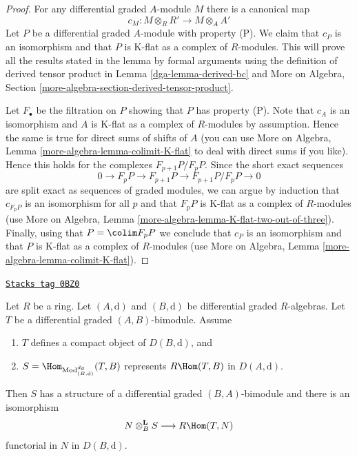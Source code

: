 \begin{proof}

For any differential graded $A$-module $M$ there is a canonical map
$$
c_M : M \otimes_R R' \longrightarrow M \otimes_A A'
$$
Let $P$ be a differential graded $A$-module with property (P).
We claim that $c_P$ is an isomorphism and that $P$ is K-flat
as a complex of $R$-modules. This will prove all the results
stated in the lemma by formal arguments using the definition
of derived tensor product in Lemma \ref{dga-lemma-derived-bc} and
More on Algebra, Section \ref{more-algebra-section-derived-tensor-product}.

\medskip\noindent
Let $F_\bullet$ be the filtration on $P$ showing that $P$ has property (P).
Note that $c_A$ is an isomorphism and $A$ is K-flat as a complex
of $R$-modules by assumption. Hence the same is true for
direct sums of shifts of $A$ (you can use
More on Algebra, Lemma \ref{more-algebra-lemma-colimit-K-flat}
to deal with direct sums if you like).
Hence this holds for the complexes $F_{p + 1}P/F_pP$.
Since the short exact sequences
$$
0 \to F_pP \to F_{p + 1}P \to F_{p + 1}P/F_pP \to 0
$$
are split exact as sequences of graded modules, we can argue
by induction that $c_{F_pP}$ is an isomorphism for all $p$
and that $F_pP$ is K-flat as a complex of $R$-modules (use
More on Algebra, Lemma \ref{more-algebra-lemma-K-flat-two-out-of-three}).
Finally, using that $P = \colim F_pP$ we conclude that
$c_P$ is an isomorphism and that $P$ is K-flat
as a complex of $R$-modules (use
More on Algebra, Lemma \ref{more-algebra-lemma-colimit-K-flat}).
\end{proof}

\begin{lemma}
\label{dga-lemma-RHom-is-tensor}
\href{https://stacks.math.columbia.edu/tag/0BZ0}{\texttt{Stacks tag 0BZ0}}

Let $R$ be a ring.
Let $(A, \text{d})$ and $(B, \text{d})$ be differential graded $R$-algebras.
Let $T$ be a differential graded $(A, B)$-bimodule.
Assume
\begin{enumerate}
\item $T$ defines a compact object of $D(B, \text{d})$, and
\item $S = \Hom_{\text{Mod}^{dg}_{(B, \text{d})}}(T, B)$
represents $R\Hom(T, B)$ in $D(A, \text{d})$.
\end{enumerate}
Then $S$ has a structure of a differential graded $(B, A)$-bimodule
and there is an isomorphism
$$
N \otimes_B^\mathbf{L} S \longrightarrow R\Hom(T, N)
$$
functorial in $N$ in $D(B, \text{d})$.
\end{lemma}

